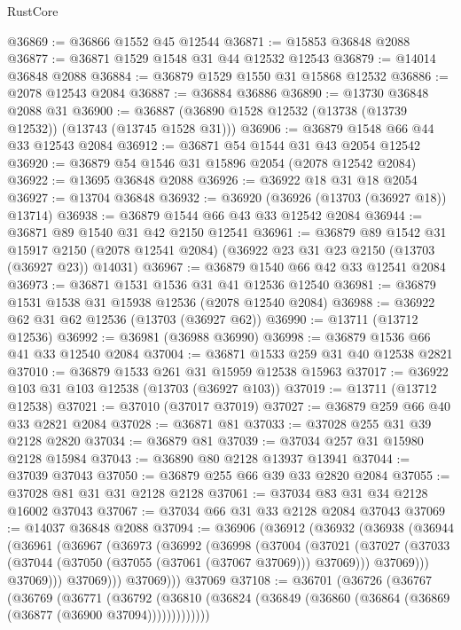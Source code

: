 \begin{lexlean}{RustCore}
\begin{coremodule}
@36869 := @36866 @1552 @45 @12544
@36871 := @15853 @36848 @2088
@36877 := @36871 @1529 @1548 @31 @44 @12532 @12543
@36879 := @14014 @36848 @2088
@36884 := @36879 @1529 @1550 @31 @15868 @12532
@36886 := @2078 @12543 @2084
@36887 := @36884 @36886
@36890 := @13730 @36848 @2088 @31
@36900 := @36887 (@36890 @1528 @12532 (@13738 (@13739 @12532)) (@13743 (@13745 @1528 @31)))
@36906 := @36879 @1548 @66 @44 @33 @12543 @2084
@36912 := @36871 @54 @1544 @31 @43 @2054 @12542
@36920 := @36879 @54 @1546 @31 @15896 @2054 (@2078 @12542 @2084)
@36922 := @13695 @36848 @2088
@36926 := @36922 @18 @31 @18 @2054
@36927 := @13704 @36848
@36932 := @36920 (@36926 (@13703 (@36927 @18)) @13714)
@36938 := @36879 @1544 @66 @43 @33 @12542 @2084
@36944 := @36871 @89 @1540 @31 @42 @2150 @12541
@36961 := @36879
    @89
    @1542
    @31
    @15917
    @2150
    (@2078 @12541 @2084)
    (@36922 @23 @31 @23 @2150 (@13703 (@36927 @23)) @14031)
@36967 := @36879 @1540 @66 @42 @33 @12541 @2084
@36973 := @36871 @1531 @1536 @31 @41 @12536 @12540
@36981 := @36879 @1531 @1538 @31 @15938 @12536 (@2078 @12540 @2084)
@36988 := @36922 @62 @31 @62 @12536 (@13703 (@36927 @62))
@36990 := @13711 (@13712 @12536)
@36992 := @36981 (@36988 @36990)
@36998 := @36879 @1536 @66 @41 @33 @12540 @2084
@37004 := @36871 @1533 @259 @31 @40 @12538 @2821
@37010 := @36879 @1533 @261 @31 @15959 @12538 @15963
@37017 := @36922 @103 @31 @103 @12538 (@13703 (@36927 @103))
@37019 := @13711 (@13712 @12538)
@37021 := @37010 (@37017 @37019)
@37027 := @36879 @259 @66 @40 @33 @2821 @2084
@37028 := @36871 @81
@37033 := @37028 @255 @31 @39 @2128 @2820
@37034 := @36879 @81
@37039 := @37034 @257 @31 @15980 @2128 @15984
@37043 := @36890 @80 @2128 @13937 @13941
@37044 := @37039 @37043
@37050 := @36879 @255 @66 @39 @33 @2820 @2084
@37055 := @37028 @81 @31 @31 @2128 @2128
@37061 := @37034 @83 @31 @34 @2128 @16002 @37043
@37067 := @37034 @66 @31 @33 @2128 @2084 @37043
@37069 := @14037 @36848 @2088
@37094 := @36906
    (@36912
      (@36932
        (@36938
          (@36944
            (@36961
              (@36967
                (@36973
                  (@36992
                    (@36998
                      (@37004
                        (@37021
                          (@37027
                            (@37033 (@37044 (@37050 (@37055 (@37061 (@37067 @37069))) @37069)))
                            @37069)))
                      @37069)))
                @37069)))
          @37069)))
    @37069
@37108 := @36701
    (@36726
      (@36767
        (@36769
          (@36771
            (@36792
              (@36810 (@36824 (@36849 (@36860 (@36864 (@36869 (@36877 (@36900 @37094)))))))))))))

\end{coremodule}
\end{lexlean}
